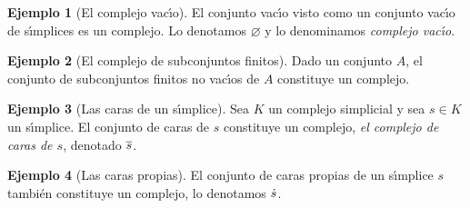 \theoremstyle{definition}
\newtheorem{ejemploVacio}{Ejemplo}[section]
\newtheorem{ejemploSubconjuntosFinitos}[ejemploVacio]{Ejemplo}
\newtheorem{ejemploCarasDeUnSimplice}[ejemploVacio]{Ejemplo}
\newtheorem{ejemploCarasPropias}[ejemploVacio]{Ejemplo}
\newtheorem{ejemploQEsqueleto}[ejemploVacio]{Ejemplo}
\newtheorem{ejemploNervioDeUnaFamilia}[ejemploVacio]{Ejemplo}
\newtheorem{ejemploSumaDeComplejos}[ejemploVacio]{Ejemplo}
\newtheorem{ejemploSegmentosEnteros}[ejemploVacio]{Ejemplo}
\newtheorem{ejemploReticulado}[ejemploVacio]{Ejemplo}
\newtheorem{ejemploSubcomplejoDeCaras}[ejemploVacio]{Ejemplo}
\newtheorem{ejemploSubcomplejosUnionInterseccion}[ejemploVacio]{Ejemplo}
\newtheorem{ejemploSubcomplejoDelNervio}[ejemploVacio]{Ejemplo}
\newtheorem{ejemploBolaYEsfera}[ejemploVacio]{Ejemplo}
\newtheorem{ejemploAproximacionesEnElCirculo}[ejemploVacio]{Ejemplo}
\newtheorem{ejemploAproximacionesEnElCirculoCont}[ejemploVacio]{Ejemplo}
\newtheorem{ejemploFuncionesNulhomotopicasEntreEsferas}[ejemploVacio]{Ejemplo}
\newtheorem{ejemploHomotopicasNoContiguas}[ejemploVacio]{Ejemplo}


\begin{ejemploVacio}[El complejo vac\'{\i}o]%
	\label{ejemplo:vacio}
	El conjunto vac\'{\i}o visto como un conjunto vac\'{\i}o de
	s\'{\i}mplices es un complejo. Lo denotamos $\varnothing$ y lo
	denominamos \emph{complejo vac\'{\i}o}.
\end{ejemploVacio}

\begin{ejemploSubconjuntosFinitos}[El complejo de subconjuntos finitos]%
	\label{ejemplo:subconjuntosfinitos}
	Dado un conjunto $A$, el conjunto de subconjuntos finitos
	no vac\'{\i}os de $A$ constituye un complejo.
\end{ejemploSubconjuntosFinitos}

\begin{ejemploCarasDeUnSimplice}[Las caras de un s\'{\i}mplice]%
	\label{ejemplo:carasdeunsimplice}
	Sea $K$ un complejo simplicial y sea $s\in K$ un s\'{\i}mplice.
	El conjunto de caras de $s$ constituye un complejo, \emph{el %
	complejo de caras de $s$}, denotado $\overline{s}$.
\end{ejemploCarasDeUnSimplice}

\begin{ejemploCarasPropias}[Las caras propias]%
	\label{ejemplo:caraspropias}
	El conjunto de caras propias de un s\'{\i}mplice $s$ tambi\'{e}n
	constituye un complejo, lo denotamos $\dot{s}$.
\end{ejemploCarasPropias}

